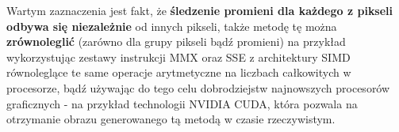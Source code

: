 Wartym zaznaczenia jest fakt, że \textbf{śledzenie promieni dla każdego z pikseli odbywa się niezależnie} od innych pikseli, także metodę tę można \textbf{zrównoleglić} (zarówno dla grupy pikseli bądź promieni) na przykład wykorzystując zestawy instrukcji MMX oraz SSE z architektury SIMD równoleglące te same operacje arytmetyczne na liczbach całkowitych w procesorze, bądź używając do tego celu dobrodziejstw najnowszych procesorów graficznych - na przykład technologii NVIDIA CUDA, która pozwala na otrzymanie obrazu generowanego tą metodą w czasie rzeczywistym.
